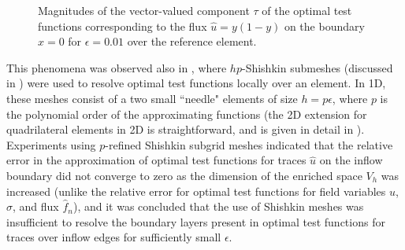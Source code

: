 \documentclass[11pt,onecolumn]{scrartcl}
\newcommand{\uh}{\widehat{u}}
\newcommand{\fnh}{\widehat{f}_n}
\begin{document}
\begin{figure}[!h]
\centering
{}
\caption{Magnitudes of the vector-valued component $\tau$ of the optimal test functions corresponding to the flux $\widehat{u}=y(1-y)$ on the boundary $x = 0$ for $\epsilon = 0.01$ over the reference element.  }
\label{fig:bl_underresolution}
\end{figure}

This phenomena was observed also in \cite{shishkinDPG}, where $hp$-Shishkin submeshes (discussed in \cite{SchwabBoundaryLayers}) were used to resolve optimal test functions locally over an element.  In 1D, these meshes consist of a two small ``needle" elements of size $h=p \epsilon$, where $p$ is the polynomial order of the approximating functions (the 2D extension for quadrilateral elements in 2D is straightforward, and is given in detail in \cite{shishkinDPG}).  Experiments using $p$-refined Shishkin subgrid meshes indicated that the relative error in the approximation of optimal test functions for traces $\uh$ on the inflow boundary did not converge to zero as the dimension of the enriched space $V_h$ was increased (unlike the relative error for optimal test functions for field variables $u$, $\sigma$, and flux $\fnh$), and it was concluded that the use of Shishkin meshes was insufficient to resolve the boundary layers present in optimal test functions for traces over inflow edges for sufficiently small $\epsilon$.
\end{document}
